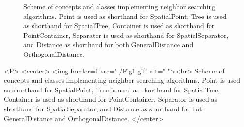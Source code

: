 \begin{ccTexOnly}
\begin{figure}[t]
\begin{center}
\leavevmode
\vspace*{-6.5cm}
\hspace*{-2cm}
\end{center}
\vspace*{6cm}
\caption{Scheme of concepts and classes implementing neighbor searching algorithms.
Point is used as shorthand for SpatialPoint, Tree is used as shorthand for SpatialTree,
Container is used as shorthand for PointContainer,
Separator is used as shorthand for SpatialSeparator,
and Distance as shorthand for both GeneralDistance and OrthogonalDistance.
\label{ASPAS:Fig1}}
\end{figure}
\end{ccTexOnly}

\begin{ccHtmlOnly}

<P>
<center>
<img border=0 src="./Fig1.gif" alt=" "><br> 
Scheme of concepts and classes implementing neighbor searching algorithms.
Point is used as shorthand for SpatialPoint, Tree is used as shorthand for SpatialTree,
Container is used as shorthand for PointContainer, Separator is used as shorthand for SpatialSeparator,
and Distance as shorthand for both GeneralDistance and OrthogonalDistance.
</center>

\end{ccHtmlOnly}

